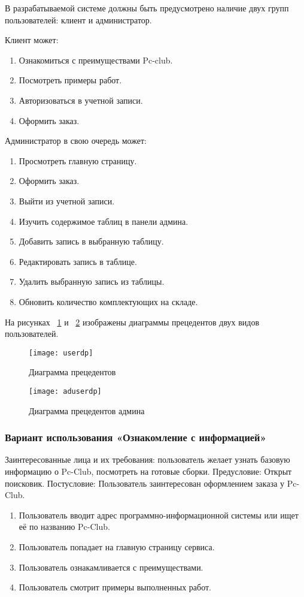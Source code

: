 В разрабатываемой системе должны быть предусмотрено наличие двух групп пользователей: клиент и администратор.

Клиент может:
\begin{enumerate}
	\item Ознакомиться с преимуществами Pc-club.
	\item Посмотреть примеры работ.
	\item Авторизоваться в учетной записи.
	\item Оформить заказ.
\end{enumerate}

Администратор в свою очередь может:
\begin{enumerate}
	\item Просмотреть главную страницу.
	\item Оформить заказ.
	\item Выйти из учетной записи.
	\item Изучить содержимое таблиц в панели админа.
	\item Добавить запись в выбранную таблицу.
	\item Редактировать запись в таблице.
	\item Удалить выбранную запись из таблицы.
	\item Обновить количество комплектующих на складе.
\end{enumerate}

На рисунках ~\ref{userdp:image} и ~\ref{aduserdp:image} изображены диаграммы прецедентов двух видов пользователей.
\begin{figure}[h]
	\texttt{[image: userdp]}
	\caption{Диаграмма прецедентов}
	\label{userdp:image}
\end{figure}
\clearpage
\begin{figure}[h]
	\texttt{[image: aduserdp]}
	\caption{Диаграмма прецедентов админа}
	\label{aduserdp:image}
\end{figure}
\clearpage

\subsubsection{Вариант использования «Ознакомление с информацией»}
Заинтересованные лица и их требования: пользователь желает узнать базовую информацию о Pc-Club, посмотреть на готовые сборки.
Предусловие: Открыт поисковик.
Постусловие: Пользователь заинтересован оформлением заказа у Pc-Club.
\begin{enumerate}
	\item Пользователь вводит адрес программно-информационной системы или ищет её по названию Pc-Club.
	\item Пользователь попадает на главную страницу сервиса.
	\item Пользователь ознакамливается с преимуществами.
	\item Пользователь смотрит примеры выполненных работ.
\end{enumerate}

